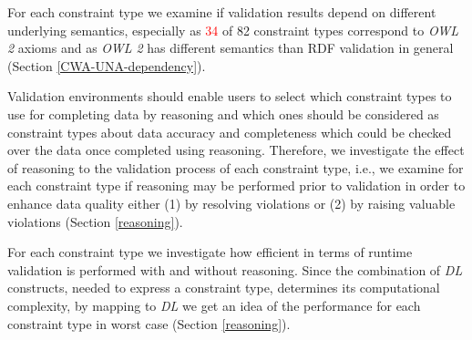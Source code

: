 \documentclass{acm_proc_article-sp}
\begin{document}
For each constraint type we examine if validation results depend on different underlying semantics, 
especially as \textcolor{red}{34} of 82 constraint types 
correspond to \emph{OWL 2} axioms and as \emph{OWL 2} has different semantics than RDF validation in general (Section \ref{CWA-UNA-dependency}).

Validation environments should enable users to select which constraint types to use for completing data by reasoning 
and which ones should be considered as constraint types about data accuracy and completeness which could be checked over the data once completed using reasoning.
Therefore, we investigate the effect of reasoning to the validation process of each constraint type, i.e.,
we examine for each constraint type if reasoning may be performed prior to validation in order to enhance data quality
either (1) by resolving violations or (2) by raising valuable violations (Section \ref{reasoning}).

For each constraint type we investigate how efficient in terms of runtime validation is performed with and without reasoning.
Since the combination of \emph{DL} constructs, needed to express a constraint type, determines its computational complexity, 
by mapping to \emph{DL} we get an idea of the performance for each constraint type in worst case (Section \ref{reasoning}).
\end{document}
